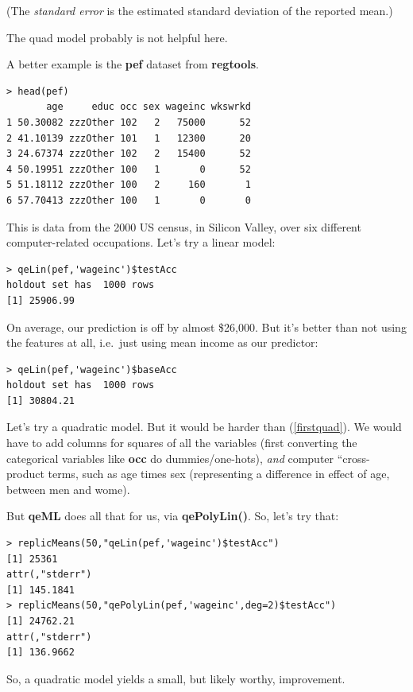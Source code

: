 (The \textit{standard error} is the estimated standard deviation of the
reported mean.)

The quad model probably is not helpful here.

A better example is the \textbf{pef} dataset from \textbf{regtools}.

\begin{lstlisting}
> head(pef)
       age     educ occ sex wageinc wkswrkd
1 50.30082 zzzOther 102   2   75000      52
2 41.10139 zzzOther 101   1   12300      20
3 24.67374 zzzOther 102   2   15400      52
4 50.19951 zzzOther 100   1       0      52
5 51.18112 zzzOther 100   2     160       1
6 57.70413 zzzOther 100   1       0       0
\end{lstlisting}

This is data from the 2000 US census, in Silicon Valley, over six
different computer-related occupations.  Let's try a linear model:

\begin{lstlisting}
> qeLin(pef,'wageinc')$testAcc
holdout set has  1000 rows
[1] 25906.99
\end{lstlisting}

On average, our prediction is off by almost \$26,000.  But it's better
than not using the features at all, i.e.\ just using mean income as our
predictor:

\begin{lstlisting}
> qeLin(pef,'wageinc')$baseAcc
holdout set has  1000 rows
[1] 30804.21
\end{lstlisting}

Let's try a quadratic model.  But it would be harder than
(\ref{firstquad}).  We would have to add columns for squares of all the 
variables (first converting the categorical variables like \textbf{occ} 
do dummies/one-hots), \textit{and} computer ``cross-product terms, such
as age times sex (representing a difference in effect of age, between
men and wome).

But \textbf{qeML} does all that for us, via \textbf{qePolyLin()}.  So,
let's try that:

\begin{lstlisting}
> replicMeans(50,"qeLin(pef,'wageinc')$testAcc")
[1] 25361
attr(,"stderr")
[1] 145.1841
> replicMeans(50,"qePolyLin(pef,'wageinc',deg=2)$testAcc")
[1] 24762.21
attr(,"stderr")
[1] 136.9662
\end{lstlisting}

So, a quadratic model yields a small, but likely worthy, improvement.

